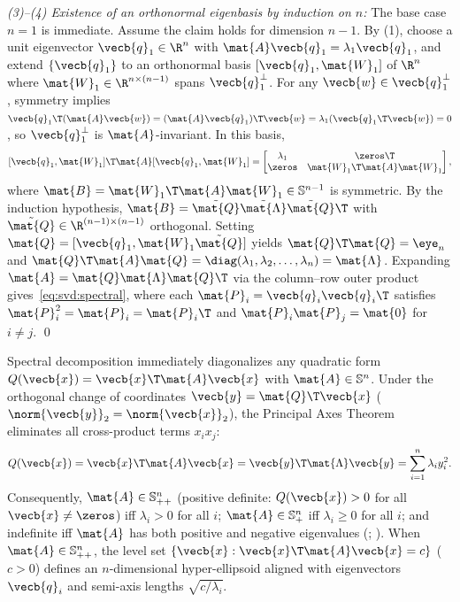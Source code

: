 \documentclass[../../../../master.tex]{subfiles}
\begin{document}
\begin{coremath}
\emph{(3)--(4) Existence of an orthonormal eigenbasis by induction on $n$:} The base case $n=1$ is immediate. Assume the claim holds for dimension $n-1$. By (1), choose a unit eigenvector $\vecb{q}_1 \in \R^n$ with $\mat{A}\vecb{q}_1 = \lambda_1\vecb{q}_1$, and extend $\{\vecb{q}_1\}$ to an orthonormal basis $[\vecb{q}_1, \mat{W}_1]$ of $\R^n$ where $\mat{W}_1 \in \R^{n \times (n-1)}$ spans $\vecb{q}_1^\perp$. For any $\vecb{w} \in \vecb{q}_1^\perp$, symmetry implies $\vecb{q}_1\T (\mat{A}\vecb{w}) = (\mat{A}\vecb{q}_1)\T \vecb{w} = \lambda_1 (\vecb{q}_1\T \vecb{w}) = 0$, so $\vecb{q}_1^\perp$ is $\mat{A}$-invariant. In this basis,
\[
  [\vecb{q}_1, \mat{W}_1]\T \mat{A} [\vecb{q}_1, \mat{W}_1] =
  \begin{bmatrix} \lambda_1 & \zeros\T \\ \zeros & \mat{W}_1\T \mat{A} \mat{W}_1 \end{bmatrix},
\]
where $\mat{B} = \mat{W}_1\T \mat{A} \mat{W}_1 \in \mathbb{S}^{n-1}$ is symmetric. By the induction hypothesis, $\mat{B} = \tilde{\mat{Q}}\tilde{\mat{\Lambda}}\tilde{\mat{Q}}\T$ with $\tilde{\mat{Q}} \in \R^{(n-1)\times(n-1)}$ orthogonal. Setting $\mat{Q} = [\vecb{q}_1, \mat{W}_1\tilde{\mat{Q}}]$ yields $\mat{Q}\T\mat{Q} = \eye_n$ and $\mat{Q}\T\mat{A}\mat{Q} = \diag(\lambda_1,\lambda_2,\dots,\lambda_n) = \mat{\Lambda}$. Expanding $\mat{A} = \mat{Q}\mat{\Lambda}\mat{Q}\T$ via the column--row outer product gives~\eqref{eq:svd:spectral}, where each $\mat{P}_i = \vecb{q}_i\vecb{q}_i\T$ satisfies $\mat{P}_i^2 = \mat{P}_i = \mat{P}_i\T$ and $\mat{P}_i\mat{P}_j = \mat{0}$ for $i \neq j$. \qed
\end{coremath}

Spectral decomposition immediately diagonalizes any quadratic form $Q(\vecb{x}) = \vecb{x}\T \mat{A} \vecb{x}$ with $\mat{A} \in \mathbb{S}^n$. Under the orthogonal change of coordinates $\vecb{y} = \mat{Q}\T \vecb{x}$ ($\norm{\vecb{y}}_2 = \norm{\vecb{x}}_2$), the Principal Axes Theorem   eliminates all cross-product terms $x_i x_j$:
\begin{equation}
\label{eq:svd:quadform}
  Q(\vecb{x}) = \vecb{x}\T \mat{A} \vecb{x} = \vecb{y}\T \mat{\Lambda} \vecb{y} = \sum_{i=1}^n \lambda_i y_i^2.
\end{equation}
Consequently, $\mat{A} \in \mathbb{S}_{++}^n$ (positive definite: $Q(\vecb{x}) > 0$ for all $\vecb{x} \neq \zeros$) iff $\lambda_i > 0$ for all $i$; $\mat{A} \in \mathbb{S}_+^n$ iff $\lambda_i \ge 0$ for all $i$; and indefinite iff $\mat{A}$ has both positive and negative eigenvalues (; ). When $\mat{A} \in \mathbb{S}_{++}^n$, the level set $\{ \vecb{x} : \vecb{x}\T \mat{A} \vecb{x} = c \}$ ($c > 0$) defines an $n$-dimensional hyper-ellipsoid aligned with eigenvectors $\vecb{q}_i$ and semi-axis lengths $\sqrt{c/\lambda_i}$.
\end{document}
